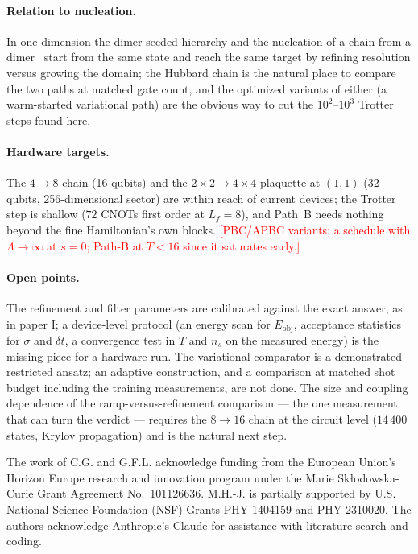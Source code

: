 \documentclass[
  aps,
  prc,
  reprint,
  superscriptaddress,
  floatfix,
  nofootinbib
]{revtex4-2}
\newcommand{\todo}[1]{\textcolor{red}{[#1]}}
\newcommand{\Eobj}{E_{\mathrm{obj}}}
\begin{document}
\paragraph{Relation to nucleation.}
In one dimension the dimer-seeded hierarchy and the nucleation of a chain
from a dimer~\cite{Sadia2026} start from the same state and reach the same
target by refining resolution versus growing the domain; the Hubbard chain
is the natural place to compare the two paths at matched gate count, and the
optimized variants of either (a warm-started variational path) are the
obvious way to cut the $10^2$--$10^3$ Trotter steps found here.

\paragraph{Hardware targets.}
The $4\to8$ chain (16 qubits) and the $2\times2\to4\times4$ plaquette at
$(1,1)$ (32 qubits, 256-dimensional sector) are within reach of current
devices; the Trotter step is shallow ($72$ CNOTs first order at $L_f=8$),
and Path~B needs nothing beyond the fine Hamiltonian's own blocks.
\todo{PBC/APBC variants; a schedule with $\Lambda\to\infty$ at $s=0$;
Path-B at $T<16$ since it saturates early.}

\paragraph{Open points.}
The refinement and filter parameters are calibrated against the exact
answer, as in paper I; a device-level protocol (an energy scan for
$\Eobj$, acceptance statistics for $\sigma$ and $\delta t$, a convergence
test in $T$ and $n_s$ on the measured energy) is the missing piece for a
hardware run.  The variational comparator is a demonstrated restricted
ansatz; an adaptive construction, and a comparison at matched shot budget
including the training measurements, are not done.  The size and coupling
dependence of the ramp-versus-refinement comparison --- the one
measurement that can turn the verdict --- requires the $8\to16$ chain at
the circuit level ($14\,400$ states, Krylov propagation) and is the natural
next step.

\begin{acknowledgments}
The work of C.G. and G.F.L. acknowledge funding from the
European Union's Horizon Europe research and innovation program under the
Marie Sk\l{}odowska-Curie Grant Agreement No.\ 101126636. M.H.-J. is
partially supported by U.S. National Science Foundation (NSF) Grants
PHY-1404159 and PHY-2310020.  The authors acknowledge Anthropic's Claude
for assistance with literature search and coding.
\end{acknowledgments}
\end{document}
